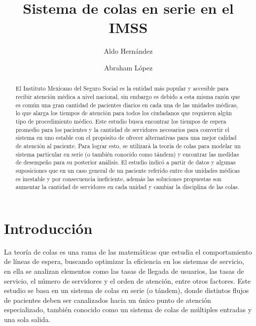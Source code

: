 \documentclass[10pt]{article}
\begin{document}
	\begin{opening}
		\title{Sistema de colas en serie en el IMSS}
		\author[Universidad Autónoma de Nuevo León, San Nicolás de los Garza, aldo.hernandezt@uanl.edu.mx]{Aldo Hernández}
		\author[Universidad Autónoma de Nuevo León, San Nicolás de los Garza, abraham.lopezg@uanl.edu.mx]{Abraham López}
		
		\begin{abstract}
            El Instituto Mexicano del Seguro Social es la entidad más popular y accesible para recibir atención médica a nivel nacional, sin embargo es debido a esta misma razón que es común una gran cantidad de pacientes diarios en cada una de las unidades médicas, lo que alarga los tiempos de atención para todos los ciudadanos que requieren algún tipo de procedimiento médico. Este estudio busca encontrar los tiempos de espera promedio para los pacientes y la cantidad de servidores necesarios para convertir el sistema en uno estable con el propósito de ofrecer alternativas para una mejor calidad de atención al paciente. Para lograr esto, se utilizará la teoría de colas para modelar un sistema particular en serie (o también conocido como tándem) y encontrar las medidas de desempeño para su posterior análisis. El estudio indicó a partir de datos y algunas suposiciones que en un caso general de un paciente referido entre dos unidades médicas es inestable y por consecuencia ineficiente, además las soluciones propuestas son aumentar la cantidad de servidores en cada unidad y cambiar la disciplina de las colas.
		\end{abstract}

	\end{opening}
	
	\section{Introducción}
	La teoría de colas es una rama de las matemáticas que estudia el comportamiento de líneas de espera, buscando optimizar la eficiencia en los sistemas de servicio, en ella se analizan elementos como las tasas de llegada de usuarios, las tasas de servicio, el número de servidores y el orden de atención, entre otros factores. Este estudio se basa en un sistema de colas en serie (o tándem), donde distintos flujos de pacientes deben ser canalizados hacia un único punto de atención especializado, también conocido como un sistema de colas de múltiples entradas y una sola salida.
	
\end{document}
